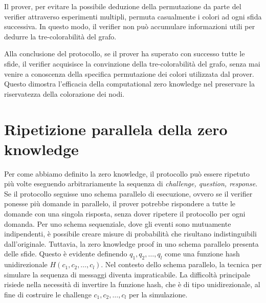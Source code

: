 Il prover, per evitare la possibile deduzione della permutazione da parte del verifier attraverso
esperimenti multipli, permuta casualmente i colori ad ogni sfida successiva. In questo modo, il verifier
non può accumulare informazioni utili per dedurre la tre-colorabilità del grafo.

Alla conclusione del protocollo, se il prover ha superato con successo tutte le sfide, il verifier acquisisce
la convinzione della tre-colorabilità del grafo, senza mai venire a conoscenza della specifica
permutazione dei colori utilizzata dal prover. Questo dimostra l'efficacia della computational zero knowledge
nel preservare la riservatezza della colorazione dei nodi.
\section{Ripetizione parallela della zero knowledge}
Per come abbiamo definito la zero knowledge, il protocollo può essere ripetuto più volte
eseguendo arbitrariamente la sequenza di \textit{challenge, question, response}.
Se il protocollo seguisse uno schema parallelo di esecuzione, ovvero se il verifier 
ponesse più domande in parallelo, il prover potrebbe rispondere a tutte le domande
con una singola risposta, senza dover ripetere il protocollo per ogni domanda.
Per uno schema sequenziale, dove gli eventi sono mutuamente indipendenti, è possibile creare
misure di probabilità che risultano indistinguibili dall'originale. Tuttavia, la zero knowledge
proof in uno schema parallelo presenta delle sfide. Questo è evidente definendo $q_1, q_2, \dots, q_l$
come una funzione hash unidirezionale $H(c_1, c_2, \dots, c_l)$. Nel contesto dello schema parallelo,
la tecnica per simulare la sequenza di messaggi diventa impraticabile. La difficoltà principale risiede
nella necessità di invertire la funzione hash, che è di tipo unidirezionale, al fine di costruire le
challenge $c_1, c_2, \dots, c_l$ per la simulazione.

